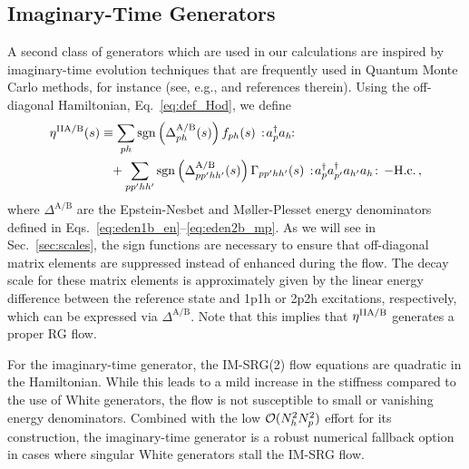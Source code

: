 \subsection{\label{sec:generators_ImTime}Imaginary-Time Generators}
A second class of generators which are used in our calculations are inspired by imaginary-time evolution techniques that are frequently used in Quantum Monte Carlo methods, for instance (see, e.g., \cite{Carlson:2015lq} and references therein). Using the off-diagonal Hamiltonian, Eq.~\eqref{eq:def_Hod}, we define
\begin{align}
  \etaO^\text{IIA/B}(s)
  &\equiv\sum_{ph} \sgn\!\left(\Delta^\text{A/B}_{ph}(s)\right)f_{ph}(s)\nord{\aaO_{p}\aO_{h}\!}\notag\\
  &\hphantom{=}
   +\sum_{pp'hh'}\sgn\!\left(\Delta^\text{A/B}_{pp'hh'}(s)\right)\Gamma_{pp'hh'}(s)\nord{\aaO_{p}\aaO_{p'}\aO_{h'}\aO_{h}}-\text{H.c.}\,,\label{eq:eta_imtime}
\end{align}
where $\Delta^\text{A/B}$ are the Epstein-Nesbet and M{\o}ller-Plesset energy denominators defined in Eqs.~\eqref{eq:eden1b_en}--\eqref{eq:eden2b_mp}. As we will see in Sec.~\ref{sec:scales}, the sign functions are necessary to ensure that off-diagonal matrix elements are suppressed instead of enhanced during the flow. The decay scale for these matrix elements is approximately given by the linear energy difference between the reference state and 1p1h or 2p2h excitations, respectively, which can be expressed via $\Delta^\text{A/B}$. Note that this implies that $\eta^\text{IIA/B}$ generates a proper RG flow.

For the imaginary-time generator, the IM-SRG(2) flow equations are quadratic in the Hamiltonian. While this leads to a mild increase in the stiffness compared to the use of White generators, the flow is not susceptible to small or vanishing energy denominators. Combined with the low $\mathcal{O}(N_h^2N_p^2)$ effort for its construction, the imaginary-time generator is a robust numerical fallback option in cases where singular White generators stall the IM-SRG flow.

